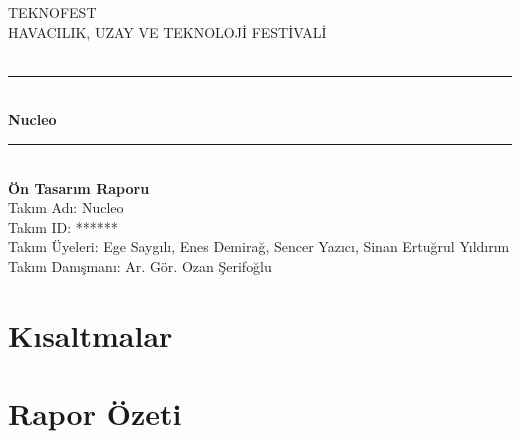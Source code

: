 \documentclass[12pt]{article}
\begin{document}
\begin{titlepage}

\newcommand{\HRule}{\rule{\linewidth}{0.5mm}}

\center

\textsc{\LARGE TEKNOFEST}\\[1.0cm]
\textsc{\large HAVACILIK, UZAY VE TEKNOLOJİ FESTİVALİ}\\[1.0cm]
\\[1.0cm]
\HRule \\[0.4cm]
{\huge \bfseries Nucleo}\\[0.3cm]
\HRule \\[1.0cm]
{\large \bfseries Ön Tasarım Raporu}\\[2cm]
{\large Takım Adı: Nucleo}\\[1cm]
{\large Takım ID: ******}\\[1cm]
{\large Takım Üyeleri: Ege Saygılı, Enes Demirağ, Sencer Yazıcı, Sinan Ertuğrul Yıldırım}\\[1cm]
{\large Takım Danışmanı: Ar. Gör. Ozan Şerifoğlu}\\[1cm]

\vfill
\end{titlepage}

\tableofcontents

\newpage
{}
\section*{Kısaltmalar}


\newpage

\section{Rapor Özeti}
\end{document}
